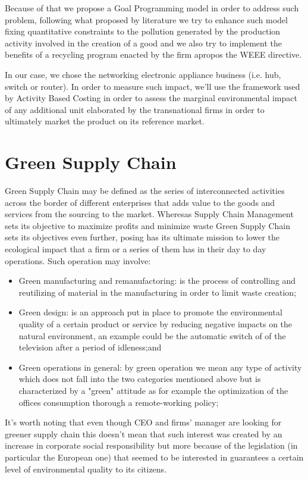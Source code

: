 \documentclass{article}
\begin{document}
  Because of that we propose a Goal Programming model in order to address such problem, following what proposed by literature we try to enhance such model fixing quantitative constraints to the pollution generated by the production activity involved in the creation of a good and we also try to implement the benefits of a recycling program enacted by the firm apropos the WEEE directive.

  In our case, we chose the networking electronic appliance business (i.e. hub, switch or router). In order to measure such impact, we'll use the framework used by Activity Based Costing in order to assess the marginal environmental impact of any additional unit elaborated by the transnational firms in order to ultimately market the product on its reference market.

\section{Green Supply Chain}
  Green Supply Chain may be defined as the series of interconnected activities across the border of different enterprises that adds value to the goods and services from the sourcing to the market. Wheresas Supply Chain Management sets its objective to maximize profits and minimize waste Green Supply Chain sets its objectives even further, posing has its ultimate mission to lower the ecological impact that a firm or a series of them has in their day to day operations. Such operation may involve:
  \begin{itemize}
    \item Green manufacturing and remanufactoring: is the process of controlling and reutilizing of material in the manufacturing in order to limit waste creation\cite{urvashi_green_2013};
    \item Green design: is an approach put in place to promote the environmental quality of a certain product or service  by reducing negative impacts on the natural environment, an example could be the automatic switch of of the television after a period of idleness\cite{ceschin_evolution_2016};and
    \item Green operations in general: by green operation we mean any type of activity which does not fall into the two categories mentioned above but is characterized by a "green" attitude as for example the optimization of the offices consumption thorough a remote-working policy;
  \end{itemize}

  It's worth noting that even though CEO and firms' manager are looking for greener supply chain this doesn't mean that such interest was created by an increase in corporate social responsibility but more because of the legislation (in particular the European one) that seemed to be interested in guarantees a certain level of environmental quality to its citizens.
\end{document}
